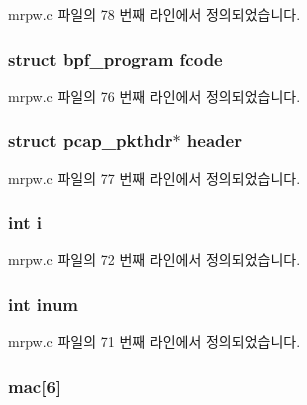 mrpw.\+c 파일의 78 번째 라인에서 정의되었습니다.

\subsubsection[{\texorpdfstring{fcode}{fcode}}]{\setlength{\rightskip}{0pt plus 5cm}struct bpf\+\_\+program fcode}\hypertarget{structnetif_ab5df78b3a2824a36a9a82c2c029e6c7c}{}\label{structnetif_ab5df78b3a2824a36a9a82c2c029e6c7c}


mrpw.\+c 파일의 76 번째 라인에서 정의되었습니다.

\subsubsection[{\texorpdfstring{header}{header}}]{\setlength{\rightskip}{0pt plus 5cm}struct pcap\+\_\+pkthdr$\ast$ header}\hypertarget{structnetif_a1b3d3ee1f9c1223d346a50fda4910f1f}{}\label{structnetif_a1b3d3ee1f9c1223d346a50fda4910f1f}


mrpw.\+c 파일의 77 번째 라인에서 정의되었습니다.

\subsubsection[{\texorpdfstring{i}{i}}]{\setlength{\rightskip}{0pt plus 5cm}int i}\hypertarget{structnetif_acb559820d9ca11295b4500f179ef6392}{}\label{structnetif_acb559820d9ca11295b4500f179ef6392}


mrpw.\+c 파일의 72 번째 라인에서 정의되었습니다.

\subsubsection[{\texorpdfstring{inum}{inum}}]{\setlength{\rightskip}{0pt plus 5cm}int inum}\hypertarget{structnetif_ae9094aa8dcdd11c80af350265c5872df}{}\label{structnetif_ae9094aa8dcdd11c80af350265c5872df}


mrpw.\+c 파일의 71 번째 라인에서 정의되었습니다.

\subsubsection[{\texorpdfstring{mac}{mac}}]{ mac\mbox{[}6\mbox{]}}\hypertarget{structnetif_a2f32c75fb4bc7ba39243ef4a9f8eacc1}{}\label{structnetif_a2f32c75fb4bc7ba39243ef4a9f8eacc1}


